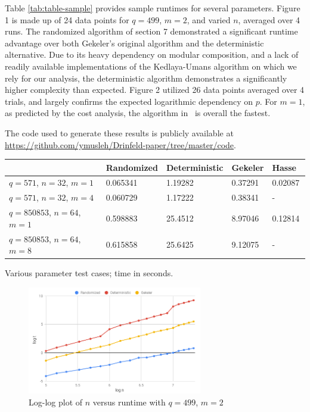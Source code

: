 \documentclass[sigconf]{acmart}
\begin{document}
Table \ref{tab:table-sample} provides sample runtimes for several
parameters. Figure 1 is made up of 24 data points for $q = 499$, $m =
2$, and varied $n$, averaged over 4 runs. The randomized algorithm of
section 7 demonstrated a significant runtime advantage over both
Gekeler's original algorithm and the deterministic alternative. Due to
its heavy dependency on modular composition, and a lack of readily
available implementations of the Kedlaya-Umans algorithm on which we
rely for our analysis, the deterministic algorithm demonstrates a
significantly higher complexity than expected. Figure 2 utilized 26
data points averaged over 4 trials, and largely confirms the expected
logarithmic dependency on $p$. For $m=1$, as predicted by the cost 
analysis, the algorithm in~\cite{eschost2017arXiv171200669D} is overall
the fastest.

The code used to generate these results is publicly available at \url{https://github.com/ymusleh/Drinfeld-paper/tree/master/code}.

\begin{center}
\begin{tabular}{ | m{1.8cm} | m{1.5cm}| m{1.6cm} | m{0.9cm} | m{1cm} | } 
\hline
 & Randomized & Deterministic & Gekeler & Hasse~\cite{eschost2017arXiv171200669D}  \\ 
\hline
$q = 571$, $n=32$, $m = 1$ & 0.065341 &	1.19282 &	0.37291 & 0.02087\\
\hline 
$q = 571$, $n=32$, $m = 4$  & 0.060729 & 1.17222 & 0.38341 & - \\ 
\hline
$q = 850853$, $n = 64$, $m=1$ & 0.598883 & 25.4512 & 8.97046 & 0.12814  \\
\hline 
$q = 850853$, $n = 64$, $m=8$ &0.615858 & 25.6425 & 9.12075 & - \\
\hline
\end{tabular}
\end{center}
\begin{table}[h!]
  \centering
  \caption{Various parameter test cases; time in seconds. }
  \label{tab:table-sample}
\end{table}

\vspace{-1cm}

\begin{figure}[h!]\label{fig:ntest499}
\centering
  \includegraphics[width=3in]{chart-499-2.png}
  \caption{Log-log plot of $n$ versus runtime with $q = 499$, $m = 2$}
\end{figure}
\end{document}
